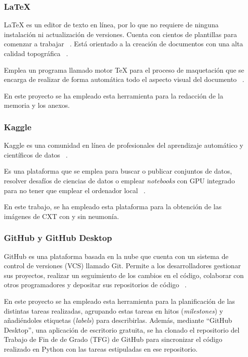 \subsubsection{LaTeX}

LaTeX es un editor de texto en línea, por lo que no requiere de ninguna instalación ni actualización de versiones. Cuenta con cientos de plantillas para comenzar a trabajar ~\cite{Over24}. Está orientado a la creación de documentos con una alta calidad topográfica ~\cite{CompHo24}.

Emplea un programa llamado motor TeX para el proceso de maquetación que se encarga de realizar de forma automática todo el aspecto visual del documento ~\cite{CompHo24}.

En este proyecto se ha empleado esta herramienta para la redacción de la memoria y los anexos.

\subsubsection{Kaggle}

Kaggle es una comunidad en línea de profesionales del aprendizaje automático y científicos de datos ~\cite{wikikaggle24}.

Es una plataforma que se emplea para buscar o publicar conjuntos de datos, resolver desafíos de ciencias de datos o emplear \textit{notebooks} con GPU integrado para no tener que emplear el ordenador local ~\cite{MaselData24}.

En este trabajo, se ha empleado esta plataforma para la obtención de las imágenes de CXT con y sin neumonía.

\subsubsection{GitHub y GitHub Desktop}

GitHub es una plataforma basada en la nube que cuenta con un sistema de control de versiones (VCS) llamado Git. Permite a los desarrolladores gestionar sus proyectos, realizar un seguimiento de los cambios en el código, colaborar con otros programadores y depositar sus repositorios de código ~\cite{HosTu24}. 

En este proyecto se ha empleado esta herramienta para la planificación de las distintas tareas realizadas, agrupando estas tareas en hitos (\textit{milestones}) y añadiéndoles etiquetas (\textit{labels}) para describirlas. Además, mediante ``GitHub Desktop'', una aplicación de escritorio gratuita, se ha clonado el repositorio del Trabajo de Fin de de Grado (TFG) de GitHub para sincronizar el código realizado en Python con las tareas estipuladas en ese repositorio.

